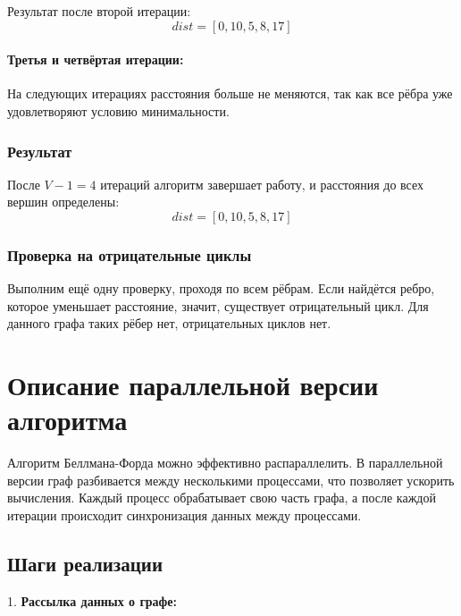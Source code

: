 \documentclass[12pt]{article}
\begin{document}
Результат после второй итерации:
\[
dist = [0, 10, 5, 8, 17]
\]

\paragraph{Третья и четвёртая итерации:}

На следующих итерациях расстояния больше не меняются, так как все рёбра уже удовлетворяют условию минимальности.

\subsubsection{Результат}

После \(V-1 = 4\) итераций алгоритм завершает работу, и расстояния до всех вершин определены:
\[
dist = [0, 10, 5, 8, 17]
\]

\subsubsection{Проверка на отрицательные циклы}

Выполним ещё одну проверку, проходя по всем рёбрам. Если найдётся ребро, которое уменьшает расстояние, значит, существует отрицательный цикл. Для данного графа таких рёбер нет, отрицательных циклов нет.


\section{Описание параллельной версии алгоритма}

Алгоритм Беллмана-Форда можно эффективно распараллелить. В параллельной версии граф разбивается между несколькими процессами, что позволяет ускорить вычисления. Каждый процесс обрабатывает свою часть графа, а после каждой итерации происходит синхронизация данных между процессами.

\subsection{Шаги реализации}

1. \textbf{Рассылка данных о графе:}
\end{document}

